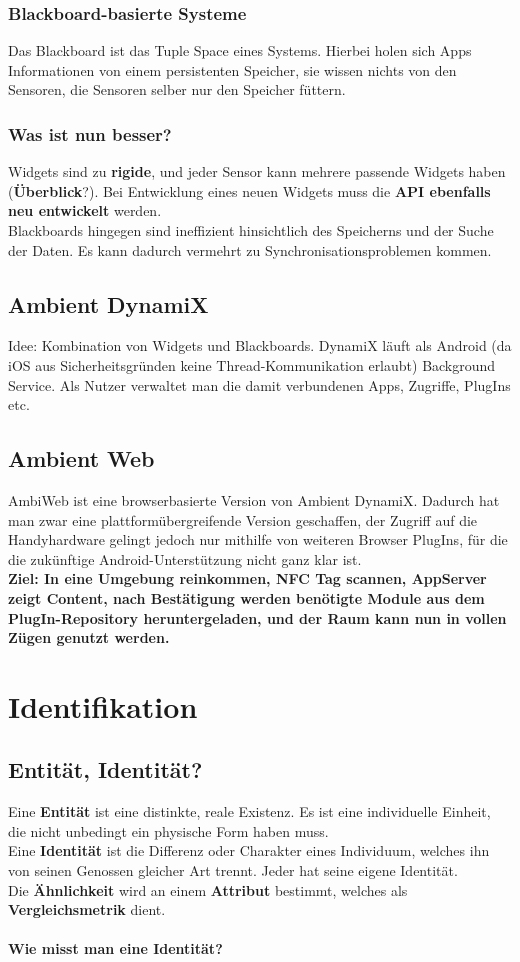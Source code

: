 \documentclass[a4paper]{article}
\begin{document}
\subsubsection{Blackboard-basierte Systeme}
Das Blackboard ist das Tuple Space eines Systems. Hierbei holen sich Apps Informationen von einem persistenten Speicher, sie wissen nichts von den Sensoren, die Sensoren selber nur den Speicher füttern.
\subsubsection{Was ist nun besser?}
Widgets sind zu \textbf{rigide}, und jeder Sensor kann mehrere passende Widgets haben (\textbf{Überblick}?). Bei Entwicklung eines neuen Widgets muss die \textbf{API ebenfalls neu entwickelt} werden. \\
Blackboards hingegen sind ineffizient hinsichtlich des Speicherns und der Suche der Daten. Es kann dadurch vermehrt zu Synchronisationsproblemen kommen.
\subsection{Ambient DynamiX}
Idee: Kombination von Widgets und Blackboards. DynamiX läuft als Android (da iOS aus Sicherheitsgründen keine Thread-Kommunikation erlaubt) Background Service. Als Nutzer verwaltet man die damit verbundenen Apps, Zugriffe, PlugIns etc.

\subsection{Ambient Web}
AmbiWeb ist eine browserbasierte Version von Ambient DynamiX. Dadurch hat man zwar eine plattformübergreifende Version geschaffen, der Zugriff auf die Handyhardware gelingt jedoch nur mithilfe von weiteren Browser PlugIns, für die die zukünftige Android-Unterstützung nicht ganz klar ist.\\

\textbf{Ziel: In eine Umgebung reinkommen, NFC Tag scannen, AppServer zeigt Content, nach Bestätigung werden benötigte Module aus dem PlugIn-Repository heruntergeladen, und der Raum kann nun in vollen Zügen genutzt werden.}

\newpage
\section{Identifikation}
\subsection{Entität, Identität?}
Eine \textbf{Entität} ist eine distinkte, reale Existenz. Es ist eine individuelle Einheit, die nicht unbedingt ein physische Form haben muss.\\
Eine \textbf{Identität} ist die Differenz oder Charakter eines Individuum, welches ihn von seinen Genossen gleicher Art trennt. Jeder hat seine eigene Identität.\\
Die \textbf{Ähnlichkeit} wird an einem \textbf{Attribut} bestimmt, welches als \textbf{Vergleichsmetrik} dient.\\
\\
\textbf{Wie misst man eine Identität?}\\
\end{document}
